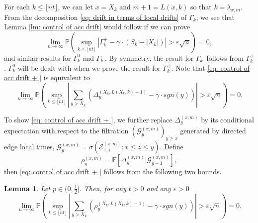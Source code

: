\documentclass[twoside,12pt, a4paper, final]{article}
\newtheorem{lemma}{Lemma}[section]
\numberwithin{equation}{section}
\theoremstyle{remark}
\newcommand{\abs}[1]{\left\vert #1 \right\vert}
\newcommand{\comment}[1]{\textcolor{blue}{(Comment: #1)}}
\begin{document}
	For each $k\leq \lfloor nt\rfloor$, we can let $x = X_k$ and $ m +1=L(x,k)$ so that $k = \lambda_{x,m}$. From the decomposition \eqref{eq: drift in terms of local drifts} of $\Gamma_k$, we see that
	Lemma \ref{lm: control of acc drift} would follow if we can prove
	\begin{equation}\label{eq: control of acc drift + }
		\lim_{n \to \infty }\mathbb{P}\left(\sup_{k\leq\lfloor nt \rfloor} \abs{\Gamma^+_k - \gamma \cdot \left(S_k - \abs{X_k} \right)   } > \varepsilon \sqrt{n}  \right) =0, 
	\end{equation}
	and similar results for $\Gamma_k^0$ and $\Gamma_k^-$. By symmetry, the result for $\Gamma_k^-$ follows from $\Gamma_k^+$. 
	$\Gamma_k^0$ will be dealt with when we prove the result for $\Gamma_k^+$.
	Note that \eqref{eq: control of acc drift + } is equivalent to
	\begin{equation}
		\lim_{n \to \infty }\mathbb{P}\left(\sup_{k\leq\lfloor nt \rfloor} \abs{\sum_{y> X_k} \left( \Delta_{y}^{(X_k,L(X_k,k) - 1)} - \gamma  \cdot sgn(y) \right)   }  > \varepsilon \sqrt{n}  \right) =0. 
	\end{equation}
	
	To show \eqref{eq: control of acc drift + }, we further replace $\Delta_{y}^{(x,m)}$ by its conditional expectation with respect to the filtration $\left(\mathcal{G}_{y}^{(x,m)}\right)_{y\geq x}$ generated by directed edge local times, $ \mathcal{G}_{y}^{(x,m)} = \sigma\left( \mathcal{E}^{(x,m)}_{z,+} : x \le z \leq y \right)$.
	Define
	\begin{equation}\label{eq: conditional mean}
		\rho_{y}^{(x,m)}= \mathbb{E}\left[\Delta_y^{(x,m)} | \mathcal{G}_{y-1}^{(x,m)}\right],
	\end{equation}
	then \eqref{eq: control of acc drift + } follows from the following two bounds.
	\begin{lemma}\label{lm: approximation of means of local drift}
		Let $p\in (0,\frac{1}{2}]$. Then, for any $t>0$ and any $\varepsilon >0$
		\begin{equation}\label{eq: control of expected local drift}
			\lim_{n \to \infty }\mathbb{P}\left(\sup_{k\leq\lfloor nt \rfloor} \abs{\sum_{y> X_k} \left( \rho_{y}^{(X_k,L(X_k,k)-1)} - \gamma  \cdot sgn(y) \right)   }  > \varepsilon \sqrt{n}  \right) =0. 
		\end{equation}
	\end{lemma}
	
\end{document}
